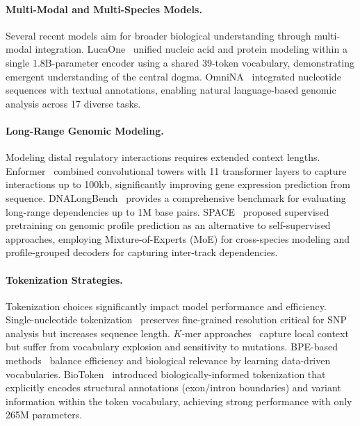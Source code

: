 \documentclass{article}
\theoremstyle{plain}
\theoremstyle{definition}
\theoremstyle{remark}
\begin{document}
\paragraph{Multi-Modal and Multi-Species Models.}
Several recent models aim for broader biological understanding through multi-modal integration. LucaOne~\citep{He2024.05.10.592927} unified nucleic acid and protein modeling within a single 1.8B-parameter encoder using a shared 39-token vocabulary, demonstrating emergent understanding of the central dogma. OmniNA~\citep{Shen2024.01.14.575543} integrated nucleotide sequences with textual annotations, enabling natural language-based genomic analysis across 17 diverse tasks.

\paragraph{Long-Range Genomic Modeling.}
Modeling distal regulatory interactions requires extended context lengths. Enformer~\citep{avsec2021enformer} combined convolutional towers with 11 transformer layers to capture interactions up to 100kb, significantly improving gene expression prediction from sequence. DNALongBench~\citep{Cheng2025.01.06.631595} provides a comprehensive benchmark for evaluating long-range dependencies up to 1M base pairs. SPACE~\citep{yang2025spacegenomicprofilepredictor} proposed supervised pretraining on genomic profile prediction as an alternative to self-supervised approaches, employing Mixture-of-Experts (MoE) for cross-species modeling and profile-grouped decoders for capturing inter-track dependencies.

\paragraph{Tokenization Strategies.}
Tokenization choices significantly impact model performance and efficiency. Single-nucleotide tokenization~\citep{nguyen2023hyenadnalongrangegenomicsequence, duan2025janusdnapowerfulbidirectionalhybrid} preserves fine-grained resolution critical for SNP analysis but increases sequence length. $K$-mer approaches~\citep{dalla2023nucleotide} capture local context but suffer from vocabulary explosion and sensitivity to mutations. BPE-based methods~\citep{zhou2024dnabert2efficientfoundationmodel, Zhou2025.01.30.635558} balance efficiency and biological relevance by learning data-driven vocabularies. BioToken~\citep{Medvedev2025.03.27.645711} introduced biologically-informed tokenization that explicitly encodes structural annotations (exon/intron boundaries) and variant information within the token vocabulary, achieving strong performance with only 265M parameters.
\end{document}

